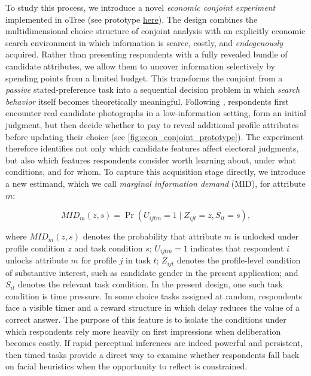 \documentclass[11pt]{article}
\begin{document}
To study this process, we introduce a novel \emph{economic conjoint experiment} implemented in oTree ({\color{blue}see prototype \href{https://econ-conjoint-project.onrender.com/}{here}}). The design combines the multidimensional choice structure of conjoint analysis \parencite{Hainmueller2014} with an explicitly economic search environment in which information is scarce, costly, and \emph{endogenously} acquired. Rather than presenting respondents with a fully revealed bundle of candidate attributes, we allow them to uncover information selectively by spending points from a limited budget. This transforms the conjoint from a \emph{passive} stated-preference task into a sequential decision problem in which \emph{search behavior} itself becomes theoretically meaningful. Following \textcite{Antonakis2009a}, respondents first encounter real candidate photographs in a low-information setting, form an initial judgment, but then decide whether to pay to reveal additional profile attributes before updating their choice (see \autoref{fig:econ_conjoint_prototype}). The experiment therefore identifies not only which candidate features affect electoral judgments, but also which features respondents consider worth learning about, under what conditions, and for whom. To capture this acquisition stage directly, we introduce a new estimand, which we call \emph{marginal information demand} (MID), for attribute $m$:

\[
MID_m(z,s) = \Pr(U_{ijtm}=1 \mid Z_{ijt}=z, S_{it}=s),
\]

where $MID_m(z,s)$ denotes the probability that attribute $m$ is unlocked under profile condition $z$ and task condition $s$; $U_{ijtm}=1$ indicates that respondent $i$ unlocks attribute $m$ for profile $j$ in task $t$; $Z_{ijt}$ denotes the profile-level condition of substantive interest, such as candidate gender in the present application; and $S_{it}$ denotes the relevant task condition. In the present design, one such task condition is time pressure. In some choice tasks assigned at random, respondents face a visible timer and a reward structure in which delay reduces the value of a correct answer. The purpose of this feature is to isolate the conditions under which respondents rely more heavily on first impressions when deliberation becomes costly. If rapid perceptual inferences are indeed powerful and persistent, then timed tasks provide a direct way to examine whether respondents fall back on facial heuristics when the opportunity to reflect is constrained.
\end{document}
